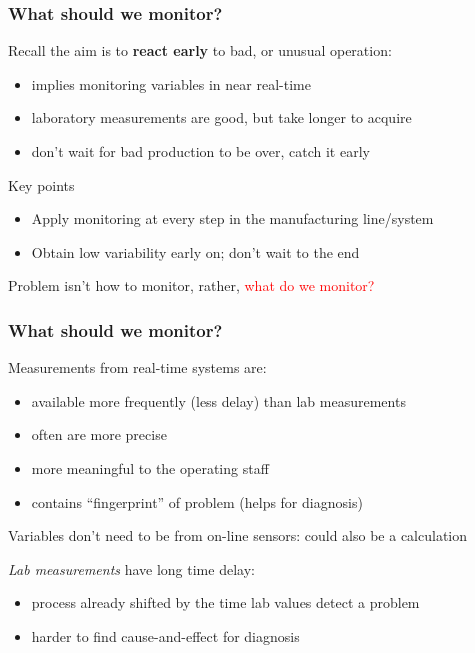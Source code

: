 \begin{frame}\frametitle{What should we monitor?}

	Recall the aim is to \textbf{react early} to bad, or unusual operation:
	\begin{itemize}
		\item	implies monitoring variables in near real-time
		\item	laboratory measurements are good, but take longer to acquire
		\item	don't wait for bad production to be over, catch it early
	\end{itemize}
	\begin{block}
		{Key points}
		\begin{center}
			\begin{itemize}
				\item	Apply monitoring at every step in the manufacturing line/system
				\item	Obtain low variability early on; don't wait to the end
			\end{itemize}
		\end{center}
	\end{block}

	Problem isn't how to monitor, rather, \textcolor{red}{what do we monitor?}
\end{frame}

\begin{frame}\frametitle{What should we monitor?}

	Measurements from real-time systems are:
	\begin{itemize}
		\item	available more frequently (less delay) than lab measurements
		\item	often are more precise
		\item	more meaningful to the operating staff
		\item	contains ``fingerprint'' of problem (helps for diagnosis)
	\end{itemize}

	Variables don't need to be from on-line sensors: could also be a calculation

	\emph{Lab measurements} have long time delay:
	\begin{itemize}
		\item	process already shifted by the time lab values detect a problem
		\item	harder to find cause-and-effect for diagnosis
	\end{itemize}
\end{frame}

